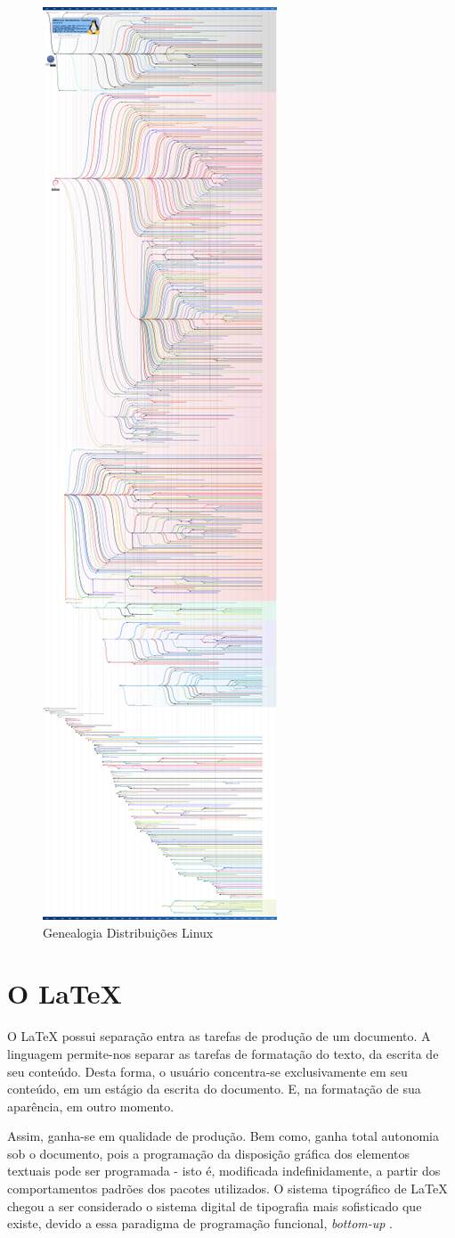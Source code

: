 \documentclass[
12pt,				%
openright,			%
oneside,			%
a4paper,			%
english,			%
french,				%
spanish,			%
brazil,				%
]{abntex2}
\begin{document}
\begin{figure}[!htb]
  \caption{\label{fig:linux-genealogy} Genealogia Distribuições Linux}
  \includegraphics[height=\textwidth, angle=-90]{diversidade}
\end{figure}

\section{O \LaTeX}

O \LaTeX{} possui separação entra as tarefas de produção de um
documento. A linguagem permite-nos separar as tarefas de formatação do texto, da escrita de seu conteúdo. Desta forma, o usuário concentra-se
exclusivamente em seu conteúdo, em um estágio da escrita do documento. E, na formatação de sua aparência, em outro momento.

Assim, ganha-se em qualidade de produção. Bem como, ganha total autonomia sob o documento, pois a programação da disposição gráfica dos elementos textuais pode ser programada - isto é, modificada indefinidamente, a partir dos comportamentos padrões dos pacotes utilizados. O sistema tipográfico de \LaTeX{} chegou a ser considerado o sistema digital de
tipografia mais sofisticado que existe, devido a essa paradigma de
programação funcional, \textit{bottom-up} \cite{haralambous2007}.
\end{document}
